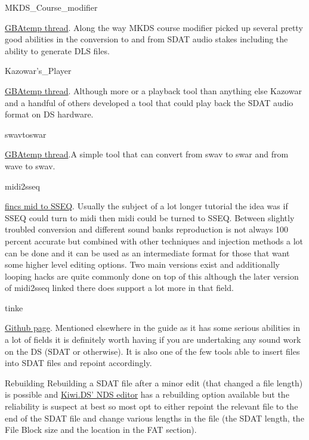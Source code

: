 \documentclass[
]{book}
\begin{document}
MKDS\_Course\_modifier

\href{http://gbatemp.net/topic/299444-mkds-course-modifier/}{GBAtemp thread}. Along the way MKDS course modifier picked up several pretty good abilities in the conversion to and from SDAT audio stakes including the ability to generate DLS files.

Kazowar's\_Player

\href{http://gbatemp.net/topic/306997-nds-music-player/}{GBAtemp thread}. Although more or a playback tool than anything else Kazowar and a handful of others developed a tool that could play back the SDAT audio format on DS hardware.

swavtoswar

\href{http://gbatemp.net/t243430-swav-to-swar-converter}{GBAtemp thread}.A simple tool that can convert from swav to swar and from wave to swav.

midi2sseq

\href{http://fincs.drunkencoders.com/2011/07/03/mid-to-sseq-converter/}{fincs mid to SSEQ}. Usually the subject of a lot longer tutorial the idea was if SSEQ could turn to midi then midi could be turned to SSEQ. Between slightly troubled conversion and different sound banks reproduction is not always 100 percent accurate but combined with other techniques and injection methods a lot can be done and it can be used as an intermediate format for those that want some higher level editing options. Two main versions exist and additionally looping hacks are quite commonly done on top of this although the later version of midi2sseq linked there does support a lot more in that field.

tinke

\href{https://github.com/pleonex/tinke}{Github page}. Mentioned elsewhere in the guide as it has some serious abilities in a lot of fields it is definitely worth having if you are undertaking any sound work on the DS (SDAT or otherwise). It is also one of the few tools able to insert files into SDAT files and repoint accordingly.

Rebuilding Rebuilding a SDAT file after a minor edit (that changed a file length) is possible and \href{http://filetrip.net/nds-downloads/utilities/download-nds-editor-01-f5658.html}{Kiwi.DS' NDS editor} has a rebuilding option available but the reliability is suspect at best so most opt to either repoint the relevant file to the end of the SDAT file and change various lengths in the file (the SDAT length, the File Block size and the location in the FAT section).
\end{document}
